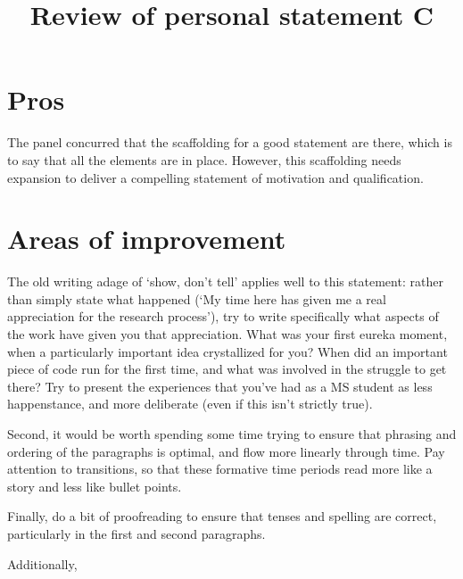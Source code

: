\documentclass{article}
\title{Review of personal statement C}
\begin{document}
\maketitle
\section{Pros}
The panel concurred that the scaffolding for a good statement are there, which is to say that all the elements are in place.  However, this scaffolding needs expansion to deliver a compelling statement of motivation and qualification. 

\section{Areas of improvement}
The old writing adage of `show, don't tell' applies well to this statement: rather than simply state what happened (`My time here has given me a real appreciation for the research process'), try to write specifically what aspects of the work have given you that appreciation.  What was your first eureka moment, when a particularly important idea crystallized for you?  When did an important piece of code run for the first time, and what was involved in the struggle to get there?  Try to present the experiences that you've had as a MS student as less happenstance, and more deliberate (even if this isn't strictly true).  

Second, it would be worth spending some time trying to ensure that phrasing and ordering of the paragraphs is optimal, and flow more linearly through time.  Pay attention to transitions, so that these formative time periods read more like a story and less like bullet points.  

Finally, do a bit of proofreading to ensure that tenses and spelling are correct, particularly in the first and second paragraphs.  

Additionally, 
\end{document}
